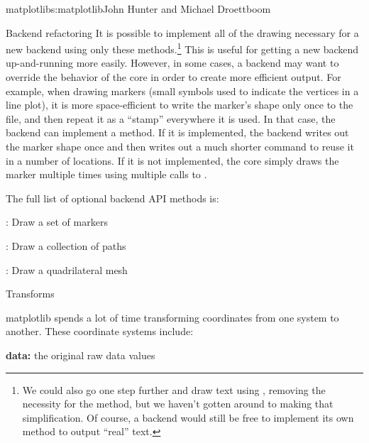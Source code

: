 \begin{aosachapter}{matplotlib}{s:matplotlib}{John Hunter and Michael Droettboom}
\begin{aosasect1}{Backend refactoring}
It is possible to implement all of the drawing necessary for a new
backend using only these methods.\footnote{We could also go one step
  further and draw text using , removing the
  necessity for the  method, but we haven't gotten
  around to making that simplification.  Of course, a backend would
  still be free to implement its own  method to
  output ``real'' text.}  This is useful for getting a new backend
up-and-running more easily.  However, in some cases, a backend may
want to override the behavior of the core in order to create more
efficient output.  For example, when drawing markers (small symbols
used to indicate the vertices in a line plot), it is more
space-efficient to write the marker's shape only once to the file, and
then repeat it as a ``stamp'' everywhere it is used.  In that case,
the backend can implement a  method.  If it is
implemented, the backend writes out the marker shape once and then
writes out a much shorter command to reuse it in a number of
locations.  If it is not implemented, the core simply draws the marker
multiple times using multiple calls to .

The full list of optional backend API methods is:

\begin{aosaitemize}

  \item {}: Draw a set of markers

  \item {}: Draw a collection of paths

  \item {}: Draw a quadrilateral mesh

\end{aosaitemize}

\end{aosasect1}

\begin{aosasect1}{Transforms}


matplotlib spends a lot of time transforming coordinates from one
system to another.  These coordinate systems include:

\begin{aosaitemize}
\item \textbf{data:} the original raw data values


\end{aosaitemize}
\end{aosasect1}
\end{aosachapter}
